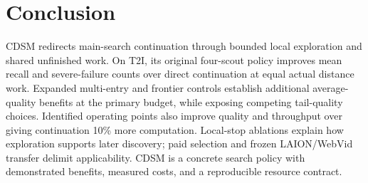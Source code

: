 \section{Conclusion}
CDSM redirects main-search continuation through bounded local exploration and shared unfinished work. On T2I, its original four-scout policy improves mean recall and severe-failure counts over direct continuation at equal actual distance work. Expanded multi-entry and frontier controls establish additional average-quality benefits at the primary budget, while exposing competing tail-quality choices. Identified operating points also improve quality and throughput over giving continuation 10\% more computation. Local-stop ablations explain how exploration supports later discovery; paid selection and frozen LAION/WebVid transfer delimit applicability. CDSM is a concrete search policy with demonstrated benefits, measured costs, and a reproducible resource contract.
